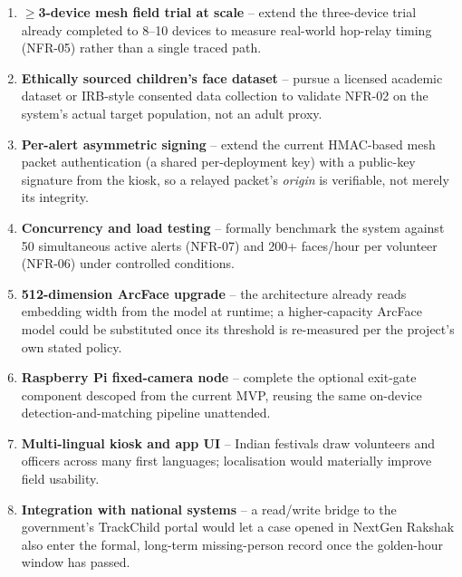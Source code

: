 \documentclass[12pt,a4paper,oneside]{report}
\begin{document}
\begin{enumerate}
  \item \textbf{$\geq$3-device mesh field trial at scale} -- extend the
        three-device trial already completed to 8--10 devices to measure
        real-world hop-relay timing (NFR-05) rather than a single traced
        path.
  \item \textbf{Ethically sourced children's face dataset} -- pursue a
        licensed academic dataset or IRB-style consented data collection
        to validate NFR-02 on the system's actual target population, not
        an adult proxy.
  \item \textbf{Per-alert asymmetric signing} -- extend the current
        HMAC-based mesh packet authentication (a shared per-deployment key)
        with a public-key signature from the kiosk, so a relayed packet's
        \emph{origin} is verifiable, not merely its integrity.
  \item \textbf{Concurrency and load testing} -- formally benchmark the
        system against 50 simultaneous active alerts (NFR-07) and 200+
        faces/hour per volunteer (NFR-06) under controlled conditions.
  \item \textbf{512-dimension ArcFace upgrade} -- the architecture already
        reads embedding width from the model at runtime; a higher-capacity
        ArcFace model could be substituted once its threshold is
        re-measured per the project's own stated policy.
  \item \textbf{Raspberry Pi fixed-camera node} -- complete the optional
        exit-gate component descoped from the current MVP, reusing the same
        on-device detection-and-matching pipeline unattended.
  \item \textbf{Multi-lingual kiosk and app UI} -- Indian festivals draw
        volunteers and officers across many first languages; localisation
        would materially improve field usability.
  \item \textbf{Integration with national systems} -- a read/write bridge
        to the government's TrackChild portal \cite{trackchild} would let a case opened in
        NextGen Rakshak also enter the formal, long-term missing-person
        record once the golden-hour window has passed.
\end{enumerate}
\end{document}
